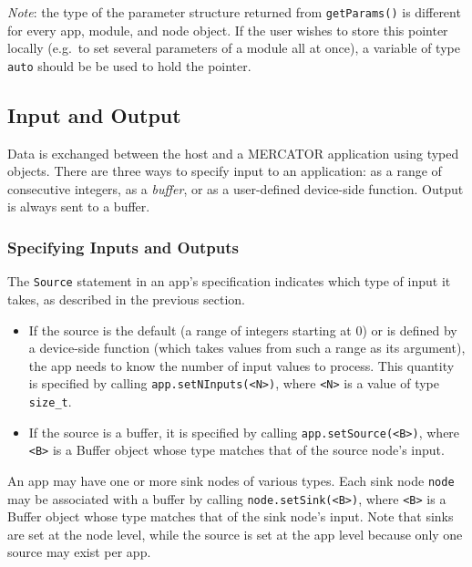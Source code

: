 \documentclass[11pt]{article}
\begin{document}
\textit{Note}: the type of the parameter structure returned from
\texttt{getParams()} is different for every app, module, and node
object.  If the user wishes to store this pointer locally (e.g.\ to
set several parameters of a module all at once), a variable of type
\texttt{auto} should be be used to hold the pointer.

\subsection{Input and Output}

Data is exchanged between the host and a MERCATOR application using
typed objects.  There are three ways to specify input to an
application: as a range of consecutive integers, as a \textit{buffer},
or as a user-defined device-side function.  Output is always sent to a
buffer.

\subsubsection{Specifying Inputs and Outputs}

The \texttt{Source} statement in an app's specification indicates
which type of input it takes, as described in the previous section.
\begin{itemize}

\item If the source is the default (a range of integers starting at 0)
  or is defined by a device-side function (which takes values from
  such a range as its argument), the app needs to know the number of
  input values to process.  This quantity is specified by calling
  \texttt{app.setNInputs(<N>)}, where \texttt{<N>} is a value of
  type \texttt{size_t}.

\item If the source is a buffer, it is specified by calling
  \texttt{app.setSource(<B>)}, where \texttt{<B>} is a Buffer object
  whose type matches that of the source node's input.

\end{itemize}

An app may have one or more sink nodes of various types.  Each sink
node \texttt{node} may be associated with a buffer by calling
\texttt{node.setSink(<B>)}, where \texttt{<B>} is a Buffer object
whose type matches that of the sink node's input.  Note that sinks are
set at the node level, while the source is set at the app level
because only one source may exist per app.
 
\end{document}
